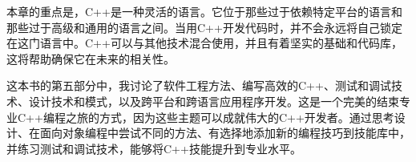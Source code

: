 本章的重点是，C++是一种灵活的语言。它位于那些过于依赖特定平台的语言和那些过于高级和通用的语言之间。当用C++开发代码时，并不会永远将自己锁定在这门语言中。C++可以与其他技术混合使用，并且有着坚实的基础和代码库，这将帮助确保它在未来的相关性。

这本书的第五部分中，我讨论了软件工程方法、编写高效的C++、测试和调试技术、设计技术和模式，以及跨平台和跨语言应用程序开发。这是一个完美的结束专业C++编程之旅的方式，因为这些主题可以成就伟大的C++开发者。通过思考设计、在面向对象编程中尝试不同的方法、有选择地添加新的编程技巧到技能库中，并练习测试和调试技术，能够将C++技能提升到专业水平。

